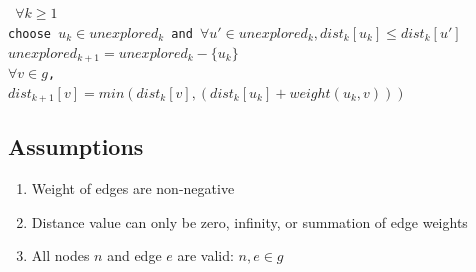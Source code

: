 \documentclass[11pt, oneside]{article}   	%
\newcommand\tab[1][1cm]{\hspace*{#1}}
\theoremstyle{definition}
\begin{document}
\\\\
\texttt{
  \tab\tab $\forall k \geq 1$\\
  \tab\tab choose $u_k \in unexplored_k$ and $\forall u' \in unexplored_k, dist_k[u_k] \leq dist_k[u']$ \\
  \tab\tab $unexplored_{k+1} = unexplored_k - \{u_k\}$                    \\
  \tab\tab $\forall v \in g$, \\
  \tab\tab\tab $dist_{k+1}[v] = min(dist_k[v], (dist_k[u_k] + weight(u_k,v)))$
  \tab\tab \\
}

\subsection{Assumptions}
\begin{enumerate}
  \item Weight of edges are non-negative
  \item Distance value can only be zero, infinity, or summation of edge weights
  \item All nodes $n$ and edge $e$ are valid: $n, e \in g$
\end{enumerate}
\end{document}
